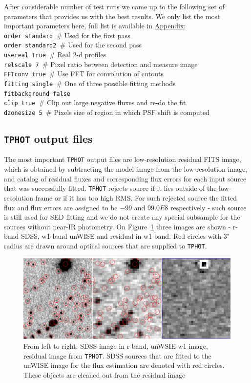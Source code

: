 After considerable number of test runs we came up to the following set of parameters that provides us with the best results. We only list the most important parameters here, full list is available in \hyperref[sec:tphot]{Appendix}:\\
{\tt order standard 			}$\#$ Used for the first pass\\
{\tt order standard2 		}$\#$ Used for the second pass\\
{\tt usereal         True    }$\#$ Real 2-d profiles\\
{\tt relscale        7		}$\#$ Pixel ratio between detection and measure image\\
{\tt FFTconv         true 	}$\#$ Use FFT for convolution of cutouts\\
{\tt fitting         single	}$\#$ One of three possible fitting methods\\
{\tt fitbackground   false}\\
{\tt clip            true 	}$\#$ Clip out large negative fluxes and re-do the fit\\
{\tt dzonesize       5 		}$\#$ Pixels size of region in which PSF shift is computed\\

\subsection{{\tt TPHOT} output files}

The most important {\tt TPHOT} output files are low-resolution residual FITS image, which is obtained by subtracting the model image from the low-resolution image, and catalog of residual fluxes and corresponding flux errors for each input source that was successfully fitted. {\tt TPHOT} rejects source if it lies outside of the low-resolution frame or if it has too high RMS. For such rejected source the fitted flux and flux errors are assigned to be $-99$ and $99.0E8$ respectively - such source is still used for SED fitting and we do not create any special subsample for the sources without near-IR photometry. On Figure~\ref{fig:resid} three images are shown - r-band SDSS, w1-band unWISE and residual in w1-band. Red circles with 3" radius are drawn around optical sources that are supplied to {\tt TPHOT}.

\begin{figure}[!ht]
\includegraphics[width=6in]{Figures/sdss_unwise_resid.png}
\caption{From left to right: SDSS image in r-band, unWSIE w1 image, residual image from {\tt TPHOT}. SDSS sources that are fitted to the unWISE image for the flux estimation are denoted with red circles. These objects are cleaned out from the residual image}
\label{fig:resid}
\end{figure}


